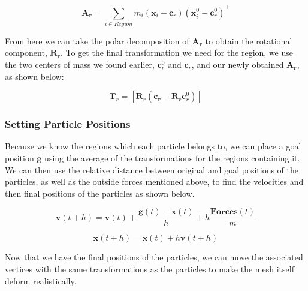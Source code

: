 \documentclass[12pt,a4paper]{amsart}
\begin{document}
	\[ \mathbf{A_r} = \sum_{i \in Region} \tilde{m}_i ( \mathbf{x}_i - \mathbf{c}_r ) ( \mathbf{x}_i^0 - \mathbf{c}_r^0 )^\top \]
	
	From here we can take the polar decomposition of $\mathbf{A_r}$ to obtain the rotational component, $\mathbf{R_{r}}$. To get the final transformation we need for the region, we use the two centers of mass we found earlier, $\mathbf{c}_r^0$ and $\mathbf{c}_r$, and our newly obtained $\mathbf{A_r}$, as shown below:
	
	\[ \mathbf{T}_r = [\mathbf{R}_r (\mathbf{c_r} - \mathbf{R}_r \mathbf{c}_r^0) ] \]
	
	\subsubsection{Setting Particle Positions}
	
	Because we know the regions which each particle belongs to, we can place a goal position $\mathbf{g}$ using the average of the transformations for the regions containing it. We can then use the relative distance between original and goal positions of the particles, as well as the outside forces mentioned above, to find the velocities and then final positions of the particles as shown below.
	
	\[ \mathbf{v}(t+h) = \mathbf{v}(t) + \frac{\mathbf{g}(t) - \mathbf{x}(t)}{h} + h \frac{\mathbf{Forces}(t)}{m} \]
	
	\[ \mathbf{x}(t+h) = \mathbf{x}(t) + h \mathbf{v}(t + h) \]
	
	Now that we have the final positions of the particles, we can move the associated vertices with the same transformations as the particles to make the mesh itself deform realistically.
	
\end{document}
